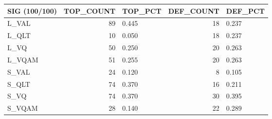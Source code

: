 \begin{tabular}{lrlrl}
\toprule
SIG (100/100) & TOP\_COUNT & TOP\_PCT & DEF\_COUNT & DEF\_PCT \\
\midrule
L\_VAL & 89 & 0.445 & 18 & 0.237 \\
L\_QLT & 10 & 0.050 & 18 & 0.237 \\
L\_VQ & 50 & 0.250 & 20 & 0.263 \\
L\_VQAM & 51 & 0.255 & 20 & 0.263 \\
S\_VAL & 24 & 0.120 & 8 & 0.105 \\
S\_QLT & 74 & 0.370 & 16 & 0.211 \\
S\_VQ & 74 & 0.370 & 30 & 0.395 \\
S\_VQAM & 28 & 0.140 & 22 & 0.289 \\
\bottomrule
\end{tabular}
